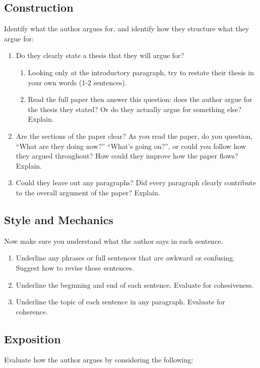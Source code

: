 \documentclass[oneside]{article}
\begin{document}
\thispagestyle{fancy}

\addtocounter{section}{1}

\subsection{Construction} Identify what the author argues for,  and identify how they structure what they argue for:
\begin{enumerate}
\item Do they clearly state a thesis that they will argue for?  
\begin{enumerate}
\item Looking only at the introductory paragraph, try to restate their thesis in your own words (1-2 sentences). 
\item Read the full paper then answer this question: does the author argue for the thesis they stated? Or do they actually argue for something else?  Explain.
\end{enumerate}

\item Are the sections of the paper clear?  As you read the paper, do you question, ``What are they doing now?''  ``What's going on?'', or could you follow how they argued throughout?  How could they improve how the paper flows?  Explain.
 
\item  Could they leave out any paragraphs?  Did every paragraph clearly contribute to the overall argument of the paper?  Explain.

\end{enumerate}

\subsection{Style and Mechanics} Now make sure you understand what the author says in each sentence. 
\begin{enumerate}
\item Underline any phrases or full sentences that are awkward or confusing. Suggest how to revise those sentences.
\item Underline the beginning and end of each sentence. Evaluate for cohesiveness. 
\item Underline the topic of each sentence in any paragraph. Evaluate for coherence. 
\end{enumerate}
\subsection{Exposition} Evaluate how the author argues by considering the following: 
\end{document}

